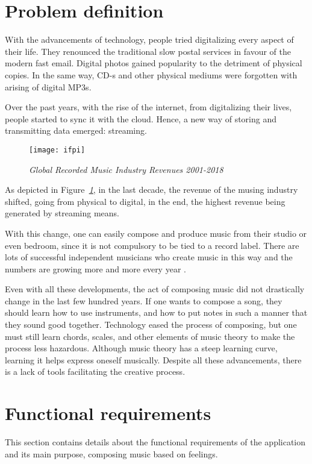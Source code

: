 \section{Problem definition}
With the advancements of technology,
people tried digitalizing every aspect of their life.
They renounced the traditional slow postal services in favour of
the modern fast email.
Digital photos gained popularity to the detriment of physical copies.
In the same way, CD-s and other physical mediums were
forgotten with arising of digital MP3s.

Over the past years, with the rise of the internet,
from digitalizing their lives, people started to sync
it with the cloud. Hence, a new way of storing and
transmitting data emerged: streaming.

\begin{figure}[h]
      \centering
      \texttt{[image: ifpi]}
      \caption{\emph{Global Recorded Music Industry Revenues 2001-2018  \cite{ifpi}}}
      \label{fig:ifpi}
\end{figure}

As depicted in  Figure\emph{~\ref{fig:ifpi}}, in the last decade,
the revenue of the musing industry shifted,
going from physical to digital, in the end,
the highest revenue being generated by streaming means.

With this change, one can easily compose and produce
music from their studio or even bedroom,
since it is not compulsory to be tied to a record label.
There are lots of successful independent musicians who
create music in this way and the numbers are growing more
and more every year \cite{forbes}.

Even with all these developments,
the act of composing music did not drastically change in the last
few hundred years. If one wants to compose a song,
they should learn how to use instruments,
and how to put notes in such a manner that they sound good together.
Technology eased the process of composing,
but one must still learn chords, scales,
and other elements of music theory to make the process less hazardous.
Although music theory has a steep learning curve,
learning it helps express oneself musically.
Despite all these advancements,
there is a lack of tools facilitating the creative process.

\section{Functional requirements}
This section contains details about the functional requirements
of the application and its main purpose,
composing music based on feelings.


